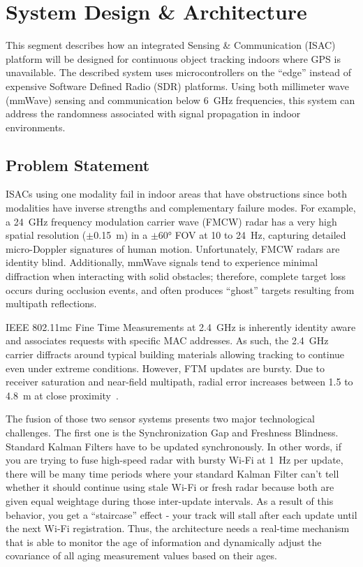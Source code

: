 \chapter{System Design \& Architecture}
\label{chap:sysdesign}

This segment describes how an integrated Sensing \& Communication (ISAC) platform will be designed for continuous object tracking indoors where GPS is unavailable. The described system uses microcontrollers on the ``edge'' instead of expensive Software Defined Radio (SDR) platforms. Using both millimeter wave (mmWave) sensing and communication below 6~GHz frequencies, this system can address the randomness associated with signal propagation in indoor environments.

\section{Problem Statement}
\label{sec:problem}

ISACs using one modality fail in indoor areas that have obstructions since both modalities have inverse strengths and complementary failure modes. For example, a 24~GHz frequency modulation carrier wave (FMCW) radar has a very high spatial resolution ($\pm$0.15~m) in a $\pm$60° FOV at 10 to 24~Hz, capturing detailed micro-Doppler signatures of human motion. Unfortunately, FMCW radars are identity blind. Additionally, mmWave signals tend to experience minimal diffraction when interacting with solid obstacles; therefore, complete target loss occurs during occlusion events, and often produces ``ghost'' targets resulting from multipath reflections.

IEEE 802.11mc Fine Time Measurements at 2.4~GHz is inherently identity aware and associates requests with specific MAC addresses. As such, the 2.4~GHz carrier diffracts around typical building materials allowing tracking to continue even under extreme conditions. However, FTM updates are bursty. Due to receiver saturation and near-field multipath, radial error increases between 1.5 to 4.8~m at close proximity~\cite{aggarwal_wifi}.

The fusion of those two sensor systems presents two major technological challenges. The first one is the Synchronization Gap and Freshness Blindness. Standard Kalman Filters have to be updated synchronously. In other words, if you are trying to fuse high-speed radar with bursty Wi-Fi at 1~Hz per update, there will be many time periods where your standard Kalman Filter can't tell whether it should continue using stale Wi-Fi or fresh radar because both are given equal weightage during those inter-update intervals. As a result of this behavior, you get a ``staircase'' effect - your track will stall after each update until the next Wi-Fi registration. Thus, the architecture needs a real-time mechanism that is able to monitor the age of information and dynamically adjust the covariance of all aging measurement values based on their ages.

